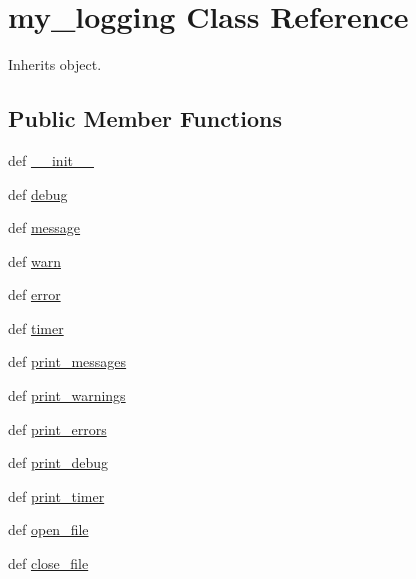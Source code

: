 \hypertarget{classpyneb_1_1utils_1_1logging_1_1my__logging}{\section{my\-\_\-logging Class Reference}
\label{classpyneb_1_1utils_1_1logging_1_1my__logging}
}


Inherits object.

\subsection*{Public Member Functions}
\begin{DoxyCompactItemize}
\item 
def \hyperlink{classpyneb_1_1utils_1_1logging_1_1my__logging_ac775ee34451fdfa742b318538164070e}{\-\_\-\-\_\-init\-\_\-\-\_\-}
\item 
def \hyperlink{classpyneb_1_1utils_1_1logging_1_1my__logging_a6aa6c68bdbce2ce3a32398d358d1d461}{debug}
\item 
def \hyperlink{classpyneb_1_1utils_1_1logging_1_1my__logging_ae4786d0b743ca42ce51f3cb0a2322f49}{message}
\item 
def \hyperlink{classpyneb_1_1utils_1_1logging_1_1my__logging_a5af91acacd75772464bda89e7d1dcbce}{warn}
\item 
def \hyperlink{classpyneb_1_1utils_1_1logging_1_1my__logging_a3133d4a0dde10b6ebe257e3db716a3e0}{error}
\item 
def \hyperlink{classpyneb_1_1utils_1_1logging_1_1my__logging_a95b119fa123f2d1393ae994f18756085}{timer}
\item 
def \hyperlink{classpyneb_1_1utils_1_1logging_1_1my__logging_a2b7347a213b70ed8d60cfa76b9738f1e}{print\-\_\-messages}
\item 
def \hyperlink{classpyneb_1_1utils_1_1logging_1_1my__logging_a5d90105a1f99109b5c48b4a73b3a78f9}{print\-\_\-warnings}
\item 
def \hyperlink{classpyneb_1_1utils_1_1logging_1_1my__logging_a22d14fa82fc2693c6429f3471d35f301}{print\-\_\-errors}
\item 
def \hyperlink{classpyneb_1_1utils_1_1logging_1_1my__logging_a21b9cd12cd06f03543452bb453dcd0dd}{print\-\_\-debug}
\item 
def \hyperlink{classpyneb_1_1utils_1_1logging_1_1my__logging_a05e14ed84ca7a4038d4c31f9e5343060}{print\-\_\-timer}
\item 
def \hyperlink{classpyneb_1_1utils_1_1logging_1_1my__logging_a3ceb0029a62c0b0b7af0a0659d2f9e4b}{open\-\_\-file}
\item 
def \hyperlink{classpyneb_1_1utils_1_1logging_1_1my__logging_a04b696395b34e131afc03636a2dbb20f}{close\-\_\-file}
\end{DoxyCompactItemize}

